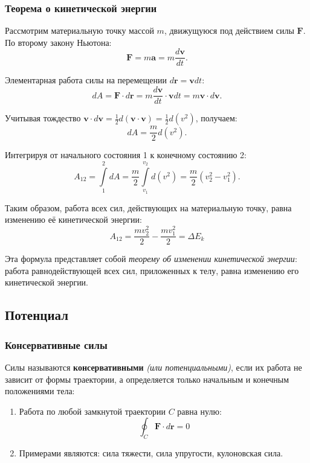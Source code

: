 \subsubsection{Теорема о кинетической энергии}

Рассмотрим материальную точку массой \(m\), движущуюся под действием силы \(\mathbf{F}\). По второму закону Ньютона:
\[
\mathbf{F} = m\mathbf{a} = m\frac{d\mathbf{v}}{dt}.
\]

Элементарная работа силы на перемещении \(d\mathbf{r} = \mathbf{v}dt\):
\[
dA = \mathbf{F} \cdot d\mathbf{r} = m\frac{d\mathbf{v}}{dt} \cdot \mathbf{v}dt = m\mathbf{v} \cdot d\mathbf{v}.
\]

Учитывая тождество \(\mathbf{v} \cdot d\mathbf{v} = \frac{1}{2}d(\mathbf{v}\cdot\mathbf{v}) = \frac{1}{2}d(v^2)\), получаем:
\[
dA = \frac{m}{2}d(v^2).
\]

Интегрируя от начального состояния 1 к конечному состоянию 2:
\[
A_{12} = \int\limits_{1}^{2} dA = \frac{m}{2}\int\limits_{v_1}^{v_2} d(v^2) = \frac{m}{2}(v_2^2 - v_1^2).
\]

Таким образом, работа всех сил, действующих на материальную точку, равна изменению её кинетической энергии:
\[\boxed{
A_{12} = \frac{mv_2^2}{2} - \frac{mv_1^2}{2} = \Delta E_k
}\]

Эта формула представляет собой \textit{теорему об изменении кинетической энергии}: работа равнодействующей всех сил, приложенных к телу, равна изменению его кинетической энергии.

\subsection{Потенциал}

\subsubsection{Консервативные силы}

Силы называются \textbf{консервативными} \textit{(или потенциальными)}, если их работа не зависит от формы траектории, а определяется только начальным и конечным положениями тела:
\begin{enumerate}
    \item Работа по любой замкнутой траектории \( C \) равна нулю:
    \[ \oint_C \mathbf{F} \cdot d\mathbf{r} = 0 \]
    \item Примерами являются: сила тяжести, сила упругости, кулоновская сила.
\end{enumerate}

